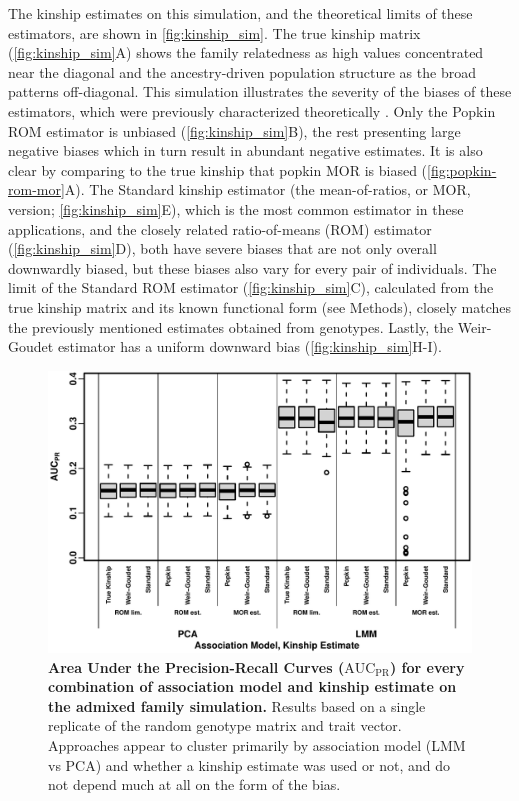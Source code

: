 \documentclass[11pt]{article}
\newcommand{\auc}{\text{AUC}_\text{PR}}
\begin{document}
The kinship estimates on this simulation, and the theoretical limits of these estimators, are shown in \cref{fig:kinship_sim}.
The true kinship matrix (\cref{fig:kinship_sim}A) shows the family relatedness as high values concentrated near the diagonal and the ancestry-driven population structure as the broad patterns off-diagonal.
This simulation illustrates the severity of the biases of these estimators, which were previously characterized theoretically \citep{ochoa_estimating_2021}.
Only the Popkin ROM estimator is unbiased (\cref{fig:kinship_sim}B), the rest presenting large negative biases which in turn result in abundant negative estimates.
It is also clear by comparing to the true kinship that popkin MOR is biased (\cref{fig:popkin-rom-mor}A).
The Standard kinship estimator (the mean-of-ratios, or MOR, version; \cref{fig:kinship_sim}E), which is the most common estimator in these applications, and the closely related ratio-of-means (ROM) estimator (\cref{fig:kinship_sim}D), both have severe biases that are not only overall downwardly biased, but these biases also vary for every pair of individuals.
The limit of the Standard ROM estimator (\cref{fig:kinship_sim}C), calculated from the true kinship matrix and its known functional form (see Methods), closely matches the previously mentioned estimates obtained from genotypes.
Lastly, the Weir-Goudet estimator has a uniform downward bias (\cref{fig:kinship_sim}H-I).


\begin{figure}[bp!]
  \centering
  \includegraphics[width=\textwidth]{sim-admix-n1000-m100000-k3-f0.3-s0.5-mc100-h0.8-g20-fes/auc.pdf}
  \caption{
    {\bf Area Under the Precision-Recall Curves ($\auc$) for every combination of association model and kinship estimate on the admixed family simulation.}
    Results based on a single replicate of the random genotype matrix and trait vector.
    Approaches appear to cluster primarily by association model (LMM vs PCA) and whether a kinship estimate was used or not, and do not depend much at all on the form of the bias.
  }
  \label{fig:auc_sim}
\end{figure}
\end{document}
